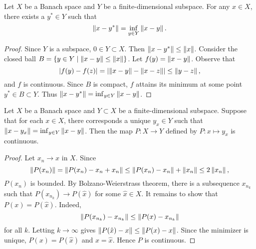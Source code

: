 \begin{theorem}
    Let $X$ be a Banach space and $Y$ be a finite-dimensional subspace. For any 
    $x\in X$, there exists a $y^*\in Y$ such that 
    \begin{equation*}
        \left\lVert {x-y^*} \right\rVert = \inf_{y\in Y}\left\lVert {x-y} \right\rVert.
    \end{equation*}
\end{theorem}
\begin{proof}
    Since $Y$ is a subspace, $0\in Y\subset X$. Then $\left\lVert {x-y^*} \right\rVert\leq\left\lVert {x} \right\rVert$. 
    Consider the closed ball $B = \left\{ y\in Y \;\middle\vert\; \left\lVert {x-y} \right\rVert\leq \left\lVert {x} \right\rVert \right\}$. Let 
    $f(y) = \left\lVert {x-y} \right\rVert$. Observe that 
    \begin{equation*}
        \left\lvert {f(y) - f(z)} \right\rvert = \left\lvert {\left\lVert {x-y} \right\rVert - \left\lVert {x-z} \right\rVert} \right\rvert \leq \left\lVert {y-z} \right\rVert,
    \end{equation*}
    and $f$ is continuous. Since $B$ is compact, $f$ attains its minimum at some 
    point $y^*\in B\subset Y$. Thus $\left\lVert {x-y^*} \right\rVert = \inf_{y\in Y}\left\lVert {x-y} \right\rVert$.
\end{proof}

\begin{lemma}
    Let $X$ be a Banach space and $Y\subset X$ be a finite-dimensional subspace. 
    Suppose that for each $x\in X$, there corresponds a unique $y_x\in Y$ such 
    that $\left\lVert {x-y_x} \right\rVert = \inf_{y\in Y}\left\lVert {x-y} \right\rVert$. Then the map $P:X\to Y$ defined 
    by $P: x\mapsto y_x$ is continuous.
\end{lemma}
\begin{proof}
    Let $x_n\to x$ in $X$. Since 
    \begin{equation*}
        \left\lVert {P(x_n)} \right\rVert = \left\lVert {P(x_n) - x_n + x_n} \right\rVert \leq \left\lVert {P(x_n) - x_n} \right\rVert + \left\lVert {x_n} \right\rVert
        \leq 2\left\lVert {x_n} \right\rVert,
    \end{equation*}
    $P(x_n)$ is bounded. By Bolzano-Weierstrass theorem, there is a subsequence 
    $x_{n_k}$ such that $P(x_{n_k})\to P(\hat{x})$ for some $\hat{x}\in X$. It 
    remains to show that $P(x) = P(\hat{x})$. Indeed, 
    \begin{equation*}
        \left\lVert {P(x_{n_k}) - x_{n_k}} \right\rVert \leq \left\lVert {P(x) - x_{n_k}} \right\rVert 
    \end{equation*}
    for all $k$. Letting $k\to\infty$ gives $\left\lVert {P(\hat{x}) - x} \right\rVert \leq \left\lVert {P(x) - x} \right\rVert$. 
    Since the minimizer is unique, $P(x) = P(\hat{x})$ and $x = \hat{x}$. Hence 
    $P$ is continuous.
\end{proof}

